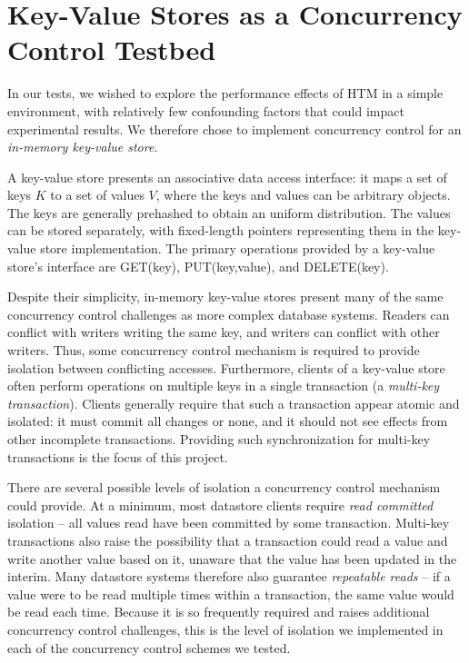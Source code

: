 \section{Key-Value Stores as a Concurrency Control Testbed} \label{sec:problem}

In our tests, we wished to explore the performance effects of HTM in a simple
environment, with relatively few confounding factors that could impact
experimental results. We therefore chose to implement concurrency control for an
\textit{in-memory key-value store}.

A key-value store presents an associative data access interface: it maps a set
of keys $K$ to a set of values $V$, where the keys and values can be arbitrary
objects. The keys are generally prehashed to obtain an uniform distribution. The
values can be stored separately, with fixed-length pointers representing them in
the key-value store implementation. The primary operations provided by a
key-value store's interface are \textsc{GET}(key), \textsc{PUT}(key,value), and
\textsc{DELETE}(key).

Despite their simplicity, in-memory key-value stores present many of the same
concurrency control challenges as more complex database systems. Readers can
conflict with writers writing the same key, and writers can conflict with other
writers. Thus, some concurrency control mechanism is required to provide
isolation between conflicting accesses. Furthermore, clients of a key-value
store often perform operations on multiple keys in a single transaction (a
\textit{multi-key transaction}). Clients generally require that such a
transaction appear atomic and isolated: it must commit all changes or none, and
it should not see effects from other incomplete transactions. Providing such
synchronization for multi-key transactions is the focus of this project.

There are several possible levels of isolation a concurrency control mechanism
could provide. At a minimum, most datastore clients require \textit{read
  committed} isolation -- all values read have been committed by some
transaction. Multi-key transactions also raise the possibility that a
transaction could read a value and write another value based on it, unaware that
the value has been updated in the interim. Many datastore systems therefore also
guarantee \textit{repeatable reads} -- if a value were to be read multiple times
within a transaction, the same value would be read each time. Because it is so
frequently required and raises additional concurrency control challenges, this
is the level of isolation we implemented in each of the concurrency control
schemes we tested.
